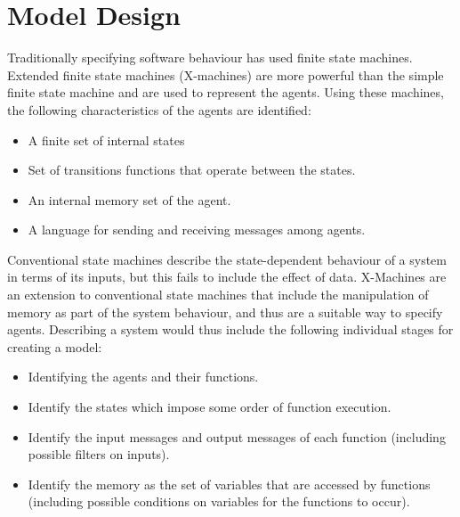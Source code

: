 \section{Model Design}\label{chap:design}
\label{model_design}

Traditionally specifying software behaviour has used finite state
machines. Extended finite state machines (X-machines) are more
powerful than the simple finite state machine and are used to
represent the agents. Using these machines, the following
characteristics of the agents are identified:

\begin{itemize}
\item A finite set of internal states
\item Set of transitions functions that operate between the states.
\item An internal memory set of the agent.
\item A language for sending and receiving messages among agents.
\end{itemize}


Conventional state machines describe the state-dependent behaviour
of a system in terms of its inputs, but this fails to include the
effect of data. X-Machines are an extension to conventional state
machines that include the manipulation of memory as part of the
system behaviour, and thus are a suitable way to specify agents.
Describing a system would thus include the following individual
stages for creating a model:

\begin{itemize}
\item Identifying the agents and their functions.
\item Identify the states which impose some order of function
execution.
\item Identify the input messages and output messages of each function
(including possible filters on inputs).
\item Identify the memory as the set of variables that are accessed by
functions (including possible conditions on variables for the
functions to occur).
\end{itemize}



